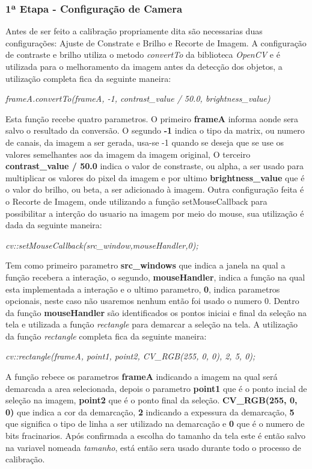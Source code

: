 	\subsubsection{1ª Etapa - Configuração de Camera}
Antes de ser feito a calibração propriamente dita são necessarias duas configurações: Ajuste de Constrate e Brilho e Recorte de Imagem.
A configuração de contraste e brilho utiliza o metodo \textit{convertTo} da biblioteca \textit{OpenCV} e é utilizada para o melhoramento da imagem antes da detecção dos objetos, a utilização completa fica da seguinte maneira:
\begin{center}
\centering \textit{ frameA.convertTo(frameA, -1, contrast\_value / 50.0, brightness\_value)}
\end{center}
Esta função recebe quatro parametros. O primeiro \textbf{frameA} informa aonde sera salvo o resultado da conversão. O segundo \textbf{-1} indica o tipo da matrix, ou numero de canais, da imagem a ser gerada, usa-se -1 quando se deseja que se use os valores semelhantes aos da imagem da imagem original\cite{OpenCV}, O terceiro \textbf{contrast\_value / 50.0} indica o valor de constraste, ou alpha, a ser usado para multiplicar os valores do pixel da imagem\cite{OpenCV} e por ultimo \textbf{brightness\_value} que é o valor do brilho, ou beta, a ser adicionado à imagem. \newline
Outra configuração feita é o Recorte de Imagem, onde utilizando a função setMouseCallback para possibilitar a interção do usuario na imagem por meio do mouse, sua utilização é dada da seguinte maneira:
\begin{center}
\centering \textit{ cv::setMouseCallback(src\_window,mouseHandler,0);}
\end{center}
Tem como primeiro parametro \textbf{src\_windows} que indica a janela na qual a função recebera a interação,  o segundo, \textbf{mouseHandler}, indica a função na qual esta implementada a interação e o ultimo parametro, \textbf{0}, indica parametros opcionais, neste caso não usaremos nenhum então foi usado o numero 0.
Dentro da função \textbf{mouseHandler} são identificados os pontos iniciai e final da seleção na tela e utilizada a função \textit{rectangle} para demarcar a seleção na tela. A utilização da função \textit{rectangle} completa fica da seguinte maneira:
\begin{center}
\centering \textit{ cv::rectangle(frameA, point1, point2, CV\_RGB(255, 0, 0), 2, 5, 0);}
\end{center}
A função rebece os parametros \textbf{frameA} indicando a imagem na qual será demarcada a area selecionada, depois o parametro \textbf{point1} que é o ponto incial de seleção na imagem, \textbf{point2} que é o ponto final da seleção. \textbf{CV\_RGB(255, 0, 0)} que indica a cor da demarcação, \textbf{2} indicando a expessura da demarcação, \textbf{5} que significa o tipo de linha a ser utilizado na demarcação e \textbf{0} que é o numero de bits fracinarios.
 Após confirmada a escolha do tamanho da tela 
este é então salvo na variavel nomeada \textit{tamanho}, está então sera usado durante todo o processo de calibração.
\newpage
